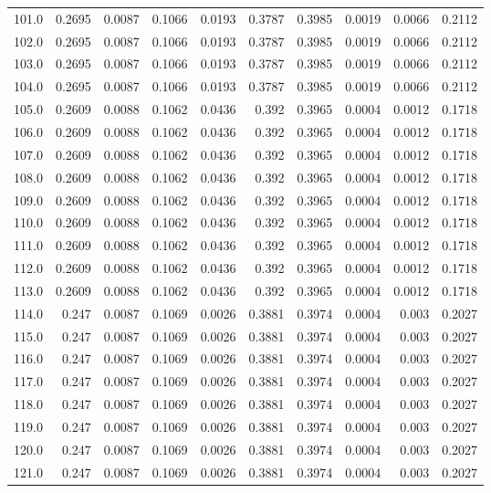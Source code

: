 \begin{longtable}{lrrrrrrrrr}
101.0 & 0.2695 & 0.0087 & 0.1066 & 0.0193 & 0.3787 & 0.3985 & 0.0019 & 0.0066 & 0.2112 \\
102.0 & 0.2695 & 0.0087 & 0.1066 & 0.0193 & 0.3787 & 0.3985 & 0.0019 & 0.0066 & 0.2112 \\
103.0 & 0.2695 & 0.0087 & 0.1066 & 0.0193 & 0.3787 & 0.3985 & 0.0019 & 0.0066 & 0.2112 \\
104.0 & 0.2695 & 0.0087 & 0.1066 & 0.0193 & 0.3787 & 0.3985 & 0.0019 & 0.0066 & 0.2112 \\
105.0 & 0.2609 & 0.0088 & 0.1062 & 0.0436 & 0.392 & 0.3965 & 0.0004 & 0.0012 & 0.1718 \\
106.0 & 0.2609 & 0.0088 & 0.1062 & 0.0436 & 0.392 & 0.3965 & 0.0004 & 0.0012 & 0.1718 \\
107.0 & 0.2609 & 0.0088 & 0.1062 & 0.0436 & 0.392 & 0.3965 & 0.0004 & 0.0012 & 0.1718 \\
108.0 & 0.2609 & 0.0088 & 0.1062 & 0.0436 & 0.392 & 0.3965 & 0.0004 & 0.0012 & 0.1718 \\
109.0 & 0.2609 & 0.0088 & 0.1062 & 0.0436 & 0.392 & 0.3965 & 0.0004 & 0.0012 & 0.1718 \\
110.0 & 0.2609 & 0.0088 & 0.1062 & 0.0436 & 0.392 & 0.3965 & 0.0004 & 0.0012 & 0.1718 \\
111.0 & 0.2609 & 0.0088 & 0.1062 & 0.0436 & 0.392 & 0.3965 & 0.0004 & 0.0012 & 0.1718 \\
112.0 & 0.2609 & 0.0088 & 0.1062 & 0.0436 & 0.392 & 0.3965 & 0.0004 & 0.0012 & 0.1718 \\
113.0 & 0.2609 & 0.0088 & 0.1062 & 0.0436 & 0.392 & 0.3965 & 0.0004 & 0.0012 & 0.1718 \\
114.0 & 0.247 & 0.0087 & 0.1069 & 0.0026 & 0.3881 & 0.3974 & 0.0004 & 0.003 & 0.2027 \\
115.0 & 0.247 & 0.0087 & 0.1069 & 0.0026 & 0.3881 & 0.3974 & 0.0004 & 0.003 & 0.2027 \\
116.0 & 0.247 & 0.0087 & 0.1069 & 0.0026 & 0.3881 & 0.3974 & 0.0004 & 0.003 & 0.2027 \\
117.0 & 0.247 & 0.0087 & 0.1069 & 0.0026 & 0.3881 & 0.3974 & 0.0004 & 0.003 & 0.2027 \\
118.0 & 0.247 & 0.0087 & 0.1069 & 0.0026 & 0.3881 & 0.3974 & 0.0004 & 0.003 & 0.2027 \\
119.0 & 0.247 & 0.0087 & 0.1069 & 0.0026 & 0.3881 & 0.3974 & 0.0004 & 0.003 & 0.2027 \\
120.0 & 0.247 & 0.0087 & 0.1069 & 0.0026 & 0.3881 & 0.3974 & 0.0004 & 0.003 & 0.2027 \\
121.0 & 0.247 & 0.0087 & 0.1069 & 0.0026 & 0.3881 & 0.3974 & 0.0004 & 0.003 & 0.2027 \\

\end{longtable}

